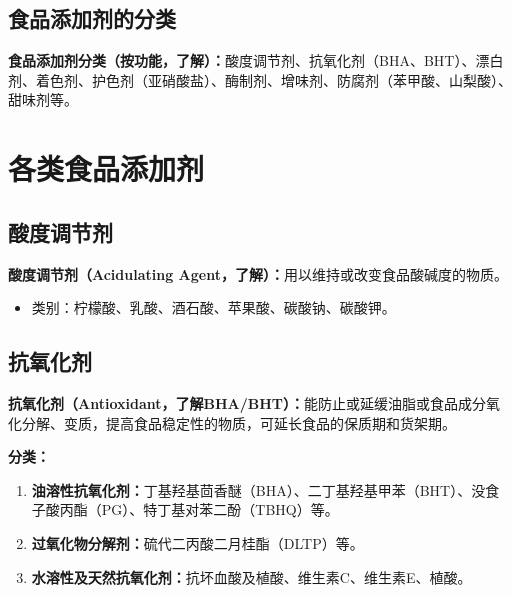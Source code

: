 \subsection{食品添加剂的分类}

\begin{defbox}
\textbf{食品添加剂分类（按功能，了解）：}酸度调节剂、抗氧化剂（BHA、BHT）、漂白剂、着色剂、护色剂（亚硝酸盐）、酶制剂、增味剂、防腐剂（苯甲酸、山梨酸）、甜味剂等。
\end{defbox}

\section{各类食品添加剂}

\subsection{酸度调节剂}

\begin{tipbox}
\textbf{酸度调节剂（Acidulating Agent，了解）：}用以维持或改变食品酸碱度的物质。

\begin{itemize}[leftmargin=*]
    \item 类别：柠檬酸、乳酸、酒石酸、苹果酸、碳酸钠、碳酸钾。
\end{itemize}
\end{tipbox}

\subsection{抗氧化剂}

\begin{tipbox}
\textbf{抗氧化剂（Antioxidant，了解BHA/BHT）：}能防止或延缓油脂或食品成分氧化分解、变质，提高食品稳定性的物质，可延长食品的保质期和货架期。

\textbf{分类：}
\begin{enumerate}[leftmargin=*]
    \item \textbf{油溶性抗氧化剂：}丁基羟基茴香醚（BHA）、二丁基羟基甲苯（BHT）、没食子酸丙酯（PG）、特丁基对苯二酚（TBHQ）等。
    \item \textbf{过氧化物分解剂：}硫代二丙酸二月桂酯（DLTP）等。
    \item \textbf{水溶性及天然抗氧化剂：}抗坏血酸及植酸、维生素C、维生素E、植酸。
\end{enumerate}
\end{tipbox}

